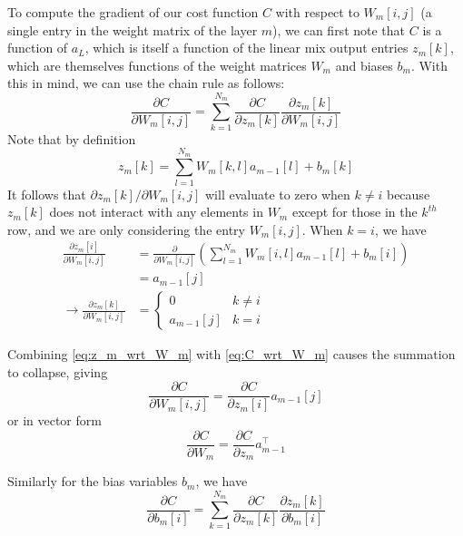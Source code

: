To compute the gradient of our cost function $C$ with respect to $W_m[i, j]$ (a single entry in the weight matrix of the layer $m$), we can first note that $C$ is a function of $a_L$, which is itself a function of the linear mix output entries $z_m[k]$, which are themselves functions of the weight matrices $W_m$ and biases $b_m$.
With this in mind, we can use the chain rule as follows:
\begin{equation}
\frac{\partial C}{\partial W_m[i, j]} = \sum_{k = 1}^{N_m} \frac{\partial C}{\partial z_m[k]} \frac{\partial z_m[k]}{\partial W_m[i, j]}
\label{eq:C_wrt_W_m}
\end{equation}
Note that by definition 
\begin{equation}
z_m[k] = \sum_{l = 1}^{N_m} W_m[k, l] a_{m - 1}[l] + b_m[k]
\end{equation}
It follows that $\partial z_m[k]/\partial W_m[i, j]$ will evaluate to zero when $k \ne i$ because $z_m[k]$ does not interact with any elements in $W_m$ except for those in the $k^{th}$ row, and we are only considering the entry $W_m[i, j]$.
When $k = i$, we have
\begin{align}
\frac{\partial z_m[i]}{\partial W_m[i, j]} &= \frac{\partial}{\partial W_m[i, j]}\left(\sum_{l = 1}^{N_m} W_m[i, l] a_{m - 1}[l] + b_m[i]\right)\\
                                           &= a_{m - 1}[j]\\
\rightarrow \frac{\partial z_m[k]}{\partial W_m[i, j]} &= \begin{cases}
0 & k \ne i\\
a_{m - 1}[j] & k = i
\end{cases}
\label{eq:z_m_wrt_W_m}
\end{align}

Combining \cref{eq:z_m_wrt_W_m} with \cref{eq:C_wrt_W_m} causes the summation to collapse, giving
\begin{equation}
        \frac{\partial C}{\partial W_m[i, j]} = \frac{\partial C}{\partial z_m[i]} a_{m - 1}[j]
\end{equation}
or in vector form
\begin{equation}
        \frac{\partial C}{\partial W_m} = \frac{\partial C}{\partial z_m} a_{m - 1}^\top
\end{equation}

Similarly for the bias variables $b_m$, we have
\begin{equation}
\frac{\partial C}{\partial b_m[i]} = \sum_{k = 1}^{N_m} \frac{\partial C}{\partial z_m[k]} \frac{\partial z_m[k]}{\partial b_m[i]}
\label{eq:C_wrt_b_m}
\end{equation}

